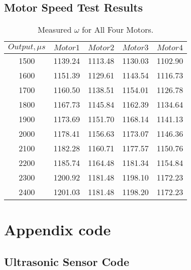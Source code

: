 \subsection{Motor Speed Test Results}
\begin{table}[H]
\centering
\begin{tabular}{|c|c|c|c|c|}
\hline
$Output,\mu s$ 	& $Motor 1$	& $Motor 2$	& $Motor 3$	& $Motor 4$ \\ \hline
1500 			& 1139.24	& 1113.48	& 1130.03	& 1102.90	\\ \hline
1600			& 1151.39	& 1129.61	& 1143.54	& 1116.73	\\ \hline
1700			& 1160.50	& 1138.51	& 1154.01	& 1126.78	\\ \hline
1800			& 1167.73	& 1145.84	& 1162.39	& 1134.64	\\ \hline
1900 			& 1173.69	& 1151.70	& 1168.14	& 1141.13	\\ \hline
2000 			& 1178.41	& 1156.63	& 1173.07	& 1146.36	\\ \hline
2100 			& 1182.28	& 1160.71	& 1177.57	& 1150.76	\\ \hline
2200			& 1185.74	& 1164.48	& 1181.34	& 1154.84	\\ \hline
2300			& 1200.92	& 1181.48	& 1198.10	& 1172.23	\\ \hline
2400 			& 1201.03	& 1181.48	& 1198.20	& 1172.23	\\ \hline
\end{tabular}
\caption{Measured $\omega$ for All Four Motors.}
\label{speedTable}
\end{table}

\section{Appendix code}
\subsection{Ultrasonic Sensor Code}


\clearpage
